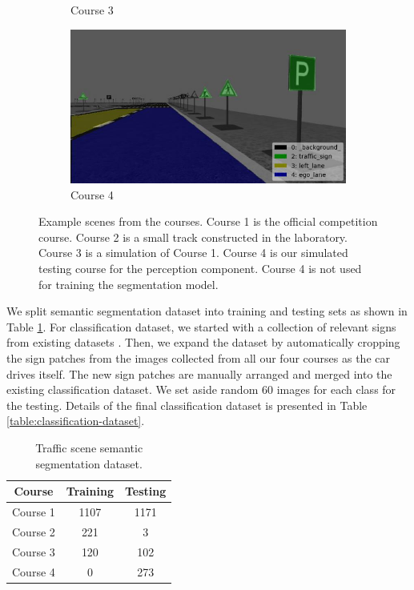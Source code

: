 \begin{figure}[h]
\begin{subfigure}[b]{0.4\linewidth}
    \caption{Course 3}
  \end{subfigure}
  \begin{subfigure}[b]{0.4\linewidth}
    \includegraphics[width=\linewidth]{figures/course4.jpg}
    \caption{Course 4}
  \end{subfigure}
  \caption{Example scenes from the courses. Course 1 is the official competition
    course. Course 2 is a small track constructed in the laboratory. Course 3
    is a simulation of Course 1. Course 4 is our simulated testing course for
    the perception component. Course 4 is not used for training the
    segmentation model.}
  \label{figure:annotated-courses}
\end{figure}

We split semantic segmentation dataset into training and testing sets as shown
in Table \ref{table:semantic-segmentation-dataset}. For classification dataset,
we started with a collection of relevant signs from existing datasets
\cite{Timofte2009MultiviewTS, Stallkamp2012ManVC}. Then, we expand the dataset
by automatically cropping the sign patches from the images collected from all
our four courses as the car drives itself. The new sign patches are manually
arranged and merged into the existing classification dataset. We set aside
random 60 images for each class for the testing. Details of the final
classification dataset is presented in Table
\ref{table:classification-dataset}.

\begin{table}[h]
  \begin{center}
    \caption{Traffic scene semantic segmentation dataset.}
    \label{table:semantic-segmentation-dataset}
    \begin{tabular}{|c|c|c|}
      \hline
      \textbf{Course}   & \textbf{Training} & \textbf{Testing} \\
      \hline
      Course 1          & 1107              & 1171 \\ 
      \hline
      Course 2          & 221               & 3 \\ 
      \hline
      Course 3          & 120               & 102 \\ 
      \hline
      Course 4          & 0                 & 273 \\
      \hline
    \end{tabular}
  \end{center}
\end{table}


